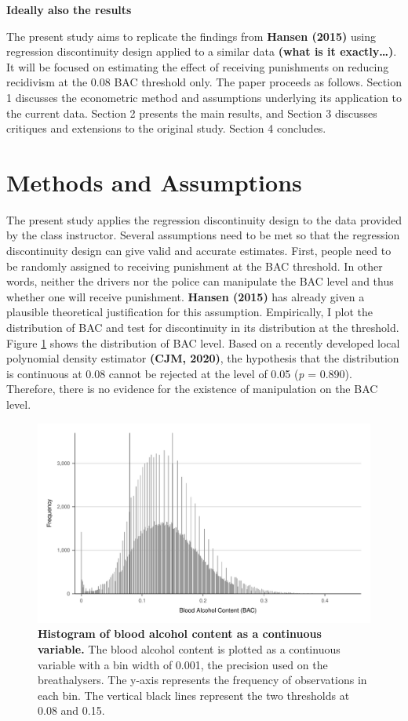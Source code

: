 \documentclass[
  11pt,
]{article}
\begin{document}
\textbf{Ideally also the results}

The present study aims to replicate the findings from \textbf{Hansen
(2015)} using regression discontinuity design applied to a similar data
\textbf{(what is it exactly\ldots)}. It will be focused on estimating
the effect of receiving punishments on reducing recidivism at the 0.08
BAC threshold only. The paper proceeds as follows. Section 1 discusses
the econometric method and assumptions underlying its application to the
current data. Section 2 presents the main results, and Section 3
discusses critiques and extensions to the original study. Section 4
concludes.

\hypertarget{methods-and-assumptions}{%
\section{Methods and Assumptions}\label{methods-and-assumptions}}

The present study applies the regression discontinuity design to the
data provided by the class instructor. Several assumptions need to be
met so that the regression discontinuity design can give valid and
accurate estimates. First, people need to be randomly assigned to
receiving punishment at the BAC threshold. In other words, neither the
drivers nor the police can manipulate the BAC level and thus whether one
will receive punishment. \textbf{Hansen (2015)} has already given a
plausible theoretical justification for this assumption. Empirically, I
plot the distribution of BAC and test for discontinuity in its
distribution at the threshold. Figure \ref{fig:bac_hist_continuous}
shows the distribution of BAC level. Based on a recently developed local
polynomial density estimator \textbf{(CJM, 2020)}, the hypothesis that
the distribution is continuous at 0.08 cannot be rejected at the level
of 0.05 (\emph{p} = 0.890). Therefore, there is no evidence for the
existence of manipulation on the BAC level.

\begin{figure}[h]
  \centering
  \includegraphics[width=0.9\columnwidth]{../figures/bac_histogram_continuous.pdf}
  \caption{\textbf{Histogram of blood alcohol content as a continuous variable.} The blood alcohol content is plotted as a continuous variable with a bin width of 0.001, the precision used on the breathalysers. The y-axis represents the frequency of observations in each bin. The vertical black lines represent the two thresholds at 0.08 and 0.15.}
  \label{fig:bac_hist_continuous}
\end{figure}
\end{document}
